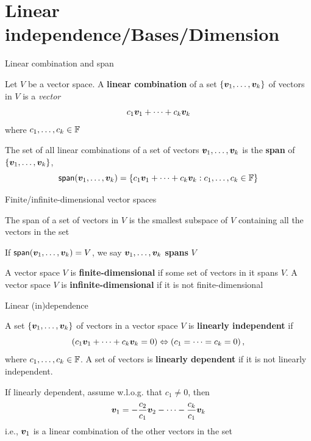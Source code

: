 \documentclass[aspectratio=169]{beamer}
\begin{document}
\section{Linear independence/Bases/Dimension}

\begin{frame}{Linear combination and span}
	\begin{definition}
		Let $V$ be a vector space.
		A \textbf{linear combination} of a set $\{\bm{v}_1,\ldots,\bm{v}_k\}$ of vectors in $V$ is a \emph{vector}
		\[
		c_1\bm{v}_1+\cdots+c_k\bm{v}_k
		\]
		where $c_1,\ldots,c_k\in\mathbb{F}$
	\end{definition}
	\vfill
	\begin{definition}[Span]
		The set of all linear combinations of a set of vectors $\bm{v}_1,\ldots,\bm{v}_k$ is the \textbf{span} of $\{\bm{v}_1,\ldots,\bm{v}_k\}$,
		\[
		\mathsf{span}(\bm{v}_1,\ldots,\bm{v}_k)=
		\left\{
		c_1\bm{v}_1+\cdots+c_k\bm{v}_k:c_1,\ldots,c_k\in\mathbb{F}
		\right\}
		\]
	\end{definition}
\end{frame}


\begin{frame}{Finite/infinite-dimensional vector spaces}
	\begin{theorem}
		The span of a set of vectors in $V$ is the smallest subspace of $V$ containing all the vectors in the set
	\end{theorem}
	\vfill
	\begin{definition}
		If $\mathsf{span}(\bm{v}_1,\ldots,\bm{v}_k)=V$, we say $\bm{v}_1,\ldots,\bm{v}_k$ \textbf{spans} $V$
	\end{definition}
	\vfill
	\begin{definition}
		A vector space $V$ is \textbf{finite-dimensional} if some set of vectors in it spans $V$.
		A vector space $V$ is \textbf{infinite-dimensional} if it is not finite-dimensional
	\end{definition}
\end{frame}


\begin{frame}{Linear (in)dependence}
	\begin{definition}
		A set $\{\bm{v}_1,\ldots,\bm{v}_k\}$ of vectors in a vector space $V$ is \textbf{linearly independent} if
		\[
		\left(c_1\bm{v}_1+\cdots+c_k\bm{v}_k=0\right)
		\Leftrightarrow
		\left(c_1=\cdots=c_k=0\right),
		\]
		where $c_1,\ldots,c_k\in\mathbb{F}$. 
		A set of vectors is \textbf{linearly dependent} if it is not linearly independent.
	\end{definition}
	\vfill
	If linearly dependent, assume w.l.o.g. that $c_1\neq 0$, then
	\[
	\bm{v}_1 = -\frac{c_2}{c_1}\bm{v}_2-\cdots-\frac{c_k}{c_1}\bm{v}_k
	\]
	i.e., $\bm{v}_1$ is a linear combination of the other vectors in the set
\end{frame}
\end{document}
